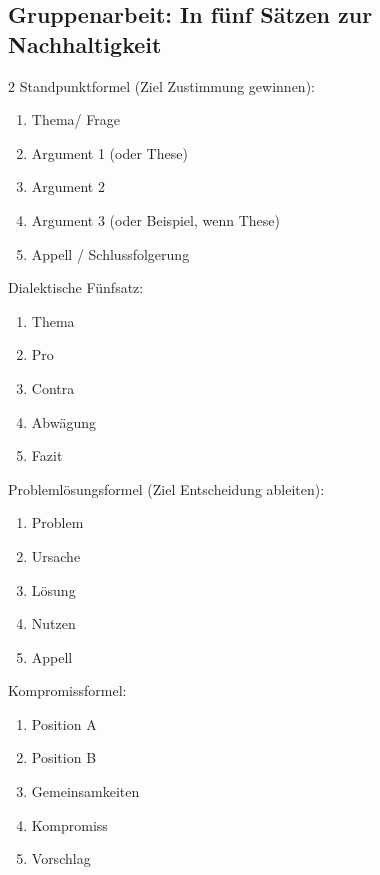 \documentclass[a4paper]{article}
\begin{document}
\subsection{Gruppenarbeit: In fünf Sätzen zur Nachhaltigkeit}

\begin{multicols*}{2}
\raggedcolumns
    Standpunktformel (Ziel Zustimmung gewinnen):

    \begin{enumerate}
        \item Thema/ Frage
        \item Argument 1 (oder These)
        \item Argument 2
        \item Argument 3 (oder Beispiel, wenn These)
        \item Appell / Schlussfolgerung
    \end{enumerate}

    Dialektische Fünfsatz:

    \begin{enumerate}
        \item Thema
        \item Pro
        \item Contra
        \item Abwägung
        \item Fazit
    \end{enumerate}
\columnbreak

    Problemlösungsformel (Ziel Entscheidung ableiten):

    \begin{enumerate}
        \item Problem
        \item Ursache
        \item Lösung
        \item Nutzen
        \item Appell
    \end{enumerate}

    Kompromissformel:

    \begin{enumerate}
        \item Position A
        \item Position B
        \item Gemeinsamkeiten
        \item Kompromiss
        \item Vorschlag
    \end{enumerate}
\end{multicols*}
\end{document}
